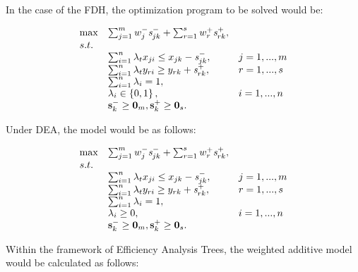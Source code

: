 In the case of the FDH, the optimization program to be solved would be:

\begin{equation} \label{(31)} 
\begin{array}{lllll} 
{} & {\max } & {\sum_{j=1}^{m}w_{j}^{-} {\it s}_{jk}^{-} + \sum_{r=1}^{s}w_{r}^{+} {\it s}_{rk}^{+},} & {} & {} \\
{} & {s.t.} & {} & {} & {} \\ 
{} & {} & {\sum_{i=1}^{n}\lambda_{t} x_{ji} \le x_{jk} - {\it s}_{jk}^{-} ,} & {j=1,...,m} & {} \\ 
{} & {} & {\sum_{i=1}^{n}\lambda_{t} y_{ri} \ge y_{rk} + {\it s}_{rk}^{+} ,} & {r=1,...,s} & {} \\ 
{} & {} & {\sum_{i=1}^{n}\lambda_{i} = 1,} & {} & {} \\ 
{} & {} & {\lambda _{i} \in \left\{0,1\right\},} & {i=1,...,n} & {} \\ 
{} & {} & {{\it \textbf{s}}_{k}^{-} \ge \textbf{0}_{m}, {\it \textbf{s}}_{k}^{+} \ge \textbf{0}_{s}.} 
\end{array}
\end{equation}

Under DEA, the model would be as follows:

\begin{equation} \label{(32)} 
\begin{array}{lllll} 
{} & {\max } & {\sum_{j=1}^{m}w_{j}^{-} {\it s}_{jk}^{-} + \sum_{r=1}^{s}w_{r}^{+} {\it s}_{rk}^{+},} & {} & {} \\
{} & {s.t.} & {} & {} & {} \\ 
{} & {} & {\sum_{i=1}^{n}\lambda_{t} x_{ji} \le x_{jk} - {\it s}_{jk}^{-} ,} & {j=1,...,m} & {} \\ 
{} & {} & {\sum_{i=1}^{n}\lambda_{t} y_{ri} \ge y_{rk} + {\it s}_{rk}^{+} ,} & {r=1,...,s} & {} \\ 
{} & {} & {\sum_{i=1}^{n}\lambda_{i} = 1,} & {} & {} \\ 
{} & {} & {\lambda _{i} \ge 0,} & {i=1,...,n} & {} \\ 
{} & {} & {{\it \textbf{s}}_{k}^{-} \ge \textbf{0}_{m}, {\it \textbf{s}}_{k}^{+} \ge \textbf{0}_{s}.} 
\end{array}
\end{equation}

Within the framework of Efficiency Analysis Trees, the weighted additive model would be calculated as follows:

